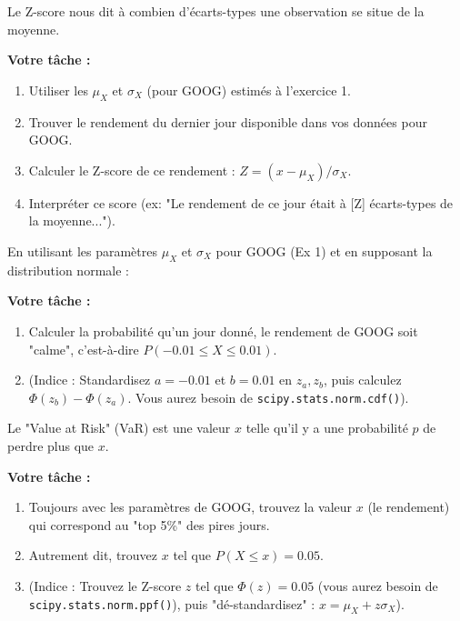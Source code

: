 \begin{exercicebox}
Le Z-score nous dit à combien d'écarts-types une observation se situe de la moyenne.

\textbf{Votre tâche :}
\begin{enumerate}
    \item Utiliser les $\mu_X$ et $\sigma_X$ (pour GOOG) estimés à l'exercice 1.
    \item Trouver le rendement du dernier jour disponible dans vos données pour GOOG.
    \item Calculer le Z-score de ce rendement : $Z = (x - \mu_X) / \sigma_X$.
    \item Interpréter ce score (ex: "Le rendement de ce jour était à [Z] écarts-types de la moyenne...").
\end{enumerate}
\end{exercicebox}

\begin{exercicebox}
En utilisant les paramètres $\mu_X$ et $\sigma_X$ pour GOOG (Ex 1) et en supposant la distribution normale :

\textbf{Votre tâche :}
\begin{enumerate}
    \item Calculer la probabilité qu'un jour donné, le rendement de GOOG soit "calme", c'est-à-dire $P(-0.01 \le X \le 0.01)$.
    \item (Indice : Standardisez $a=-0.01$ et $b=0.01$ en $z_a, z_b$, puis calculez $\Phi(z_b) - \Phi(z_a)$. Vous aurez besoin de \texttt{scipy.stats.norm.cdf()}).
\end{enumerate}
\end{exercicebox}

\begin{exercicebox}
Le "Value at Risk" (VaR) est une valeur $x$ telle qu'il y a une probabilité $p$ de perdre plus que $x$.

\textbf{Votre tâche :}
\begin{enumerate}
    \item Toujours avec les paramètres de GOOG, trouvez la valeur $x$ (le rendement) qui correspond au "top 5\%" des pires jours.
    \item Autrement dit, trouvez $x$ tel que $P(X \le x) = 0.05$.
    \item (Indice : Trouvez le Z-score $z$ tel que $\Phi(z) = 0.05$ (vous aurez besoin de \texttt{scipy.stats.norm.ppf()}), puis "dé-standardisez" : $x = \mu_X + z \sigma_X$).
\end{enumerate}
\end{exercicebox}

